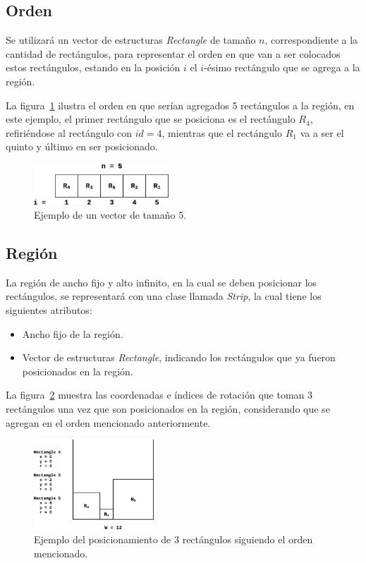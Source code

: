 \documentclass[letter, 10pt]{article}
\begin{document}
\subsection{Orden}

Se utilizar\'a un vector de estructuras \emph{Rectangle} de tama\~no $n$, correspondiente a la cantidad de rect\'angulos, para representar el orden en que van a ser colocados estos rect\'angulos, estando en la posici\'on $i$ el $i$-\'esimo rect\'angulo que se agrega a la regi\'on.

La figura~\ref{fig:orden} ilustra el orden en que ser\'ian agregados 5 rect\'angulos a la regi\'on, en este ejemplo, el primer rect\'angulo que se posiciona es el rect\'angulo $R_4$, refiri\'endose al rect\'angulo con $id = 4$, mientras que el rect\'angulo $R_1$ va a ser el quinto y \'ultimo en ser posicionado.

\begin{figure}[H]
    \centering
    \includegraphics[width=0.45\textwidth]{images/orden.eps}
    \caption{Ejemplo de un vector de tama\~no 5.}
    \label{fig:orden}
\end{figure}

\subsection{Regi\'on}

La regi\'on de ancho fijo y alto infinito, en la cual se deben posicionar los rect\'angulos, se representar\'a con una clase llamada \emph{Strip}, la cual tiene los siguientes atributos:
\begin{itemize}
    \item Ancho fijo de la regi\'on.
    \item Vector de estructuras \emph{Rectangle}, indicando los rect\'angulos que ya fueron posicionados en la regi\'on.
\end{itemize}

La figura~\ref{fig:region} muestra las coordenadas e \'indices de rotaci\'on que toman 3 rect\'angulos una vez que son posicionados en la regi\'on, considerando que se agregan en el orden mencionado anteriormente.

\begin{figure}[H]
    \centering
    \includegraphics[width = 0.4\textwidth]{images/region.eps}
    \caption{Ejemplo del posicionamiento de 3 rect\'angulos siguiendo el orden mencionado.}
    \label{fig:region}
\end{figure}
\end{document}
